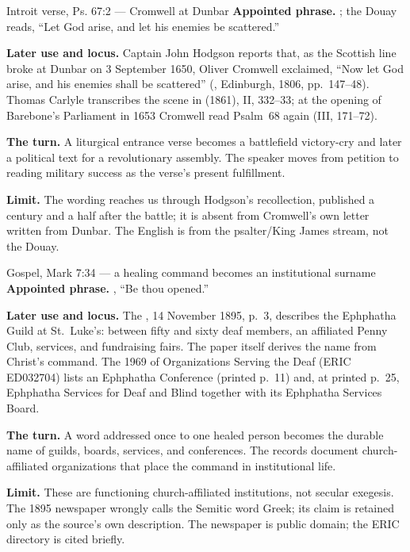 \begin{afterlife}{Introit verse, Ps. 67:2 --- Cromwell at Dunbar}
\textbf{Appointed phrase.} ;
the Douay reads, ``Let God arise, and let his enemies be scattered.''

\textbf{Later use and locus.} Captain John Hodgson reports that, as the
Scottish line broke at Dunbar on 3 September 1650, Oliver Cromwell exclaimed,
``Now let God arise, and his enemies shall be scattered'' (, Edinburgh, 1806, pp.~147--48). Thomas Carlyle transcribes the scene
in  (1861), II, 332--33; at the
opening of Barebone's Parliament in 1653 Cromwell read Psalm~68 again (III,
171--72).

\textbf{The turn.} A liturgical entrance verse becomes a battlefield
victory-cry and later a political text for a revolutionary assembly. The
speaker moves from petition to reading military success as the verse's
present fulfillment.

\textbf{Limit.} The wording reaches us through Hodgson's recollection,
published a century and a half after the battle; it is absent from Cromwell's
own letter written from Dunbar.
The English is from the psalter/King James stream, not the Douay.
\end{afterlife}

\begin{afterlife}{Gospel, Mark 7:34 --- a healing command becomes an institutional surname}
\textbf{Appointed phrase.} , ``Be thou opened.''

\textbf{Later use and locus.} The , 14 November 1895,
p.~3, describes the Ephphatha Guild at St.~Luke's: between fifty and sixty
deaf members, an affiliated Penny Club, services, and fundraising fairs. The
paper itself derives the name from Christ's command. The 1969  of Organizations Serving the Deaf (ERIC ED032704)
lists an Ephphatha Conference (printed p.~11) and, at printed p.~25,
Ephphatha Services for Deaf and Blind together with its Ephphatha Services
Board.

\textbf{The turn.} A word addressed once to one healed person becomes the
durable name of guilds, boards, services, and conferences. The records
document church-affiliated organizations that place the command in
institutional life.

\textbf{Limit.} These are functioning church-affiliated institutions, not
secular exegesis. The 1895 newspaper wrongly calls the Semitic word Greek;
its claim is retained only as the source's own description. The newspaper is
public domain; the ERIC directory is cited briefly.
\end{afterlife}
